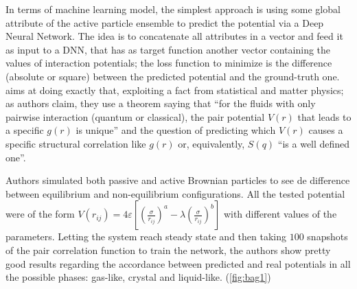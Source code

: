 \documentclass[../../master_thesis_np.tex]{subfiles}
\begin{document}
	In terms of machine learning model, the simplest approach is using some global attribute of the active particle ensemble to predict the potential via a Deep Neural Network. %
	The idea is to concatenate all attributes in a vector and feed it as input to a DNN, that has as target function another vector containing the values of interaction potentials; the loss function to minimize is the difference (absolute or square) between the predicted potential and the ground-truth one.
	\cite{bag_interaction_2021} aims at doing exactly that, exploiting a fact from statistical and matter physics; as authors claim, they use a theorem saying that \enquote{for the fluids with only pairwise interaction (quantum or classical), the pair potential $V(r)$ that leads to a specific $g(r)$ is unique} and the question of predicting which $V(r)$ causes a specific structural correlation like $g(r)$ or, equivalently, $S(q)$ \enquote{is a well defined one}. 
	
	Authors simulated both passive and active Brownian particles to see de difference between equilibrium and non-equilibrium configurations. 
	All the tested potential were of the form $V(r_{ij}) = 4\varepsilon \left[ \left( \frac{\sigma}{r_{ij}} \right)^a - \lambda \left( \frac{\sigma}{r_{ij}} \right)^b \right]$ with different values of the parameters. 
	Letting the system reach steady state and then taking $100$ snapshots of the pair correlation function to train the network, the authors show pretty good results regarding the accordance between predicted and real potentials in all the possible phases: gas-like, crystal and liquid-like. (\ref{fig:bag1})
	
\end{document}
